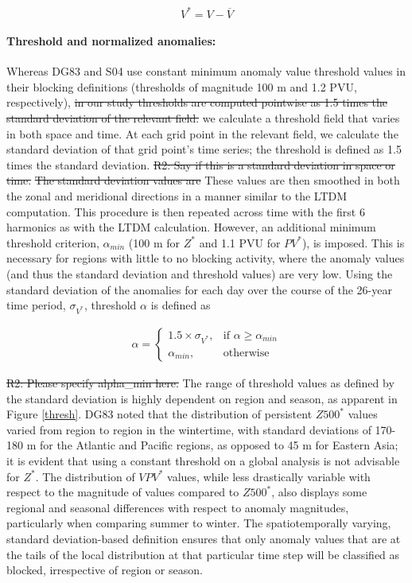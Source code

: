 \documentclass[smallextended]{svjour3}       %
\numberwithin{equation}{section}
\begin{document}
\begin{equation}
V^* = V-\overline{V}
\end{equation}

\paragraph{Threshold and normalized anomalies:} Whereas DG83 and S04 use constant minimum anomaly value threshold values in their blocking definitions (thresholds of magnitude 100 m and 1.2 PVU, respectively), {\color{blue}\sout{in our study thresholds are computed pointwise as 1.5 times the standard deviation of the relevant field.} we calculate a threshold field that varies in both space and time. At each grid point in the relevant field, we calculate the standard deviation of that grid point's time series; the threshold is defined as 1.5 times the standard deviation.}
{\color{teal}\sout{R2: Say if this is a standard deviation in space or time.}}
{\color{blue}\sout{The standard deviation values are} These values are then} smoothed in both the zonal and meridional directions in a manner similar to the LTDM computation. This procedure is then repeated across time with the first 6 harmonics as with the LTDM calculation. However, an additional minimum threshold criterion, {\color{blue}$\alpha_{min}$} (100 m for $Z^*$ and 1.1 PVU for $PV^*$), is imposed. This is necessary for regions with little to no blocking activity, where the anomaly values (and thus the standard deviation and threshold values) are very low. Using the standard deviation of the anomalies for each day over the course of the 26-year time period, $\sigma_{V^*}$, threshold $\alpha$ is defined as 

\begin{eqnarray}
\alpha =  
\begin{cases}
    1.5\times \sigma_{V^*},& \text{if } \alpha\geq \alpha_{min}\\
    \alpha_{min},              & \text{otherwise}
\end{cases}
\end{eqnarray}


{\color{teal}\sout{R2: Please specify alpha\_min here.}}
The range of threshold values as defined by the standard deviation is highly dependent on region and season, as apparent in Figure \ref{thresh}. DG83 noted that the distribution of persistent $Z500^*$ values varied from region to region in the wintertime, with standard deviations of 170-180 m for the Atlantic and Pacific regions, as opposed to 45 m for Eastern Asia; it is evident that using a constant threshold on a global analysis is not advisable for $Z^*$. The distribution of $VPV^*$ values, while less drastically variable with respect to the magnitude of values compared to $Z500^*$, also displays some regional and seasonal differences with respect to anomaly magnitudes, particularly when comparing summer to winter. The spatiotemporally varying, standard deviation-based definition ensures that only anomaly values that are at the tails of the local distribution at that particular time step will be classified as blocked, irrespective of region or season.  
\end{document}
